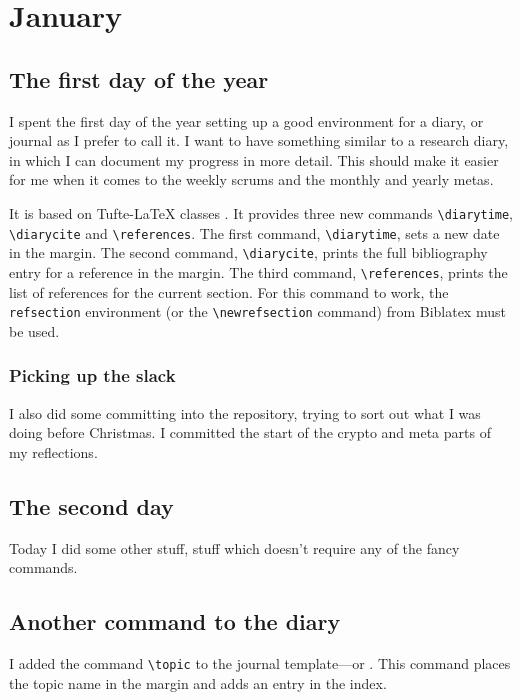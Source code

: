 \chapter{January}

\section{The first day of the year}
\newrefsection
{}
I spent the first day of the year setting up a good environment for a diary, or 
journal as I prefer to call it.
I want to have something similar to a research diary, in which I can document 
my progress in more detail.
This should make it easier for me when it comes to the weekly scrums and the 
monthly and yearly metas.

It is based on Tufte-LaTeX classes .
It provides three new commands \verb'\diarytime', \verb'\diarycite' and 
\verb'\references'.
The first command, \verb'\diarytime', sets a new date in the margin.
The second command, \verb'\diarycite', prints the full bibliography entry for 
a reference in the margin.
The third command, \verb'\references', prints the list of references for the 
current section.
For this command to work, the \verb'refsection' environment (or the 
\verb'\newrefsection' command) from Biblatex  must be used.

\subsection{Picking up the slack}
I also did some committing into the repository, trying to sort out what I was 
doing before Christmas.
I committed the start of the crypto and meta parts of my 
reflections.



\section{The second day}
Today I did some other stuff, stuff which doesn't require any of the fancy 
commands.


\section{Another command to the diary}
I added the command \verb'\topic' to the journal template---or .
This command places the topic name in the margin and adds an entry in the 
index.
